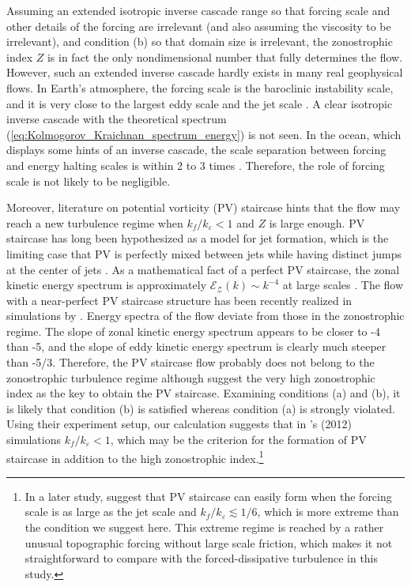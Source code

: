\documentclass{ametsoc}
\begin{document}
Assuming an extended isotropic inverse cascade range so that forcing
scale and other details of the forcing are irrelevant (and also assuming
the viscosity to be irrelevant), and condition (b) so that domain
size is irrelevant, the zonostrophic index $Z$ is in fact the only
nondimensional number that fully determines the flow. However, such
an extended inverse cascade hardly exists in many real geophysical
flows. In Earth's atmosphere, the forcing scale is the baroclinic
instability scale, and it is very close to the largest eddy scale
and the jet scale \citep{Schneider2006,Merlis2009}. A clear isotropic
inverse cascade with the theoretical spectrum (\ref{eq:Kolmogorov_Kraichnan_spectrum_energy})
is not seen. In the ocean, which displays some hints of an inverse
cascade, the scale separation between forcing and energy halting scales
is within 2 to 3 times \citep{Tulloch2011}. Therefore, the role of
forcing scale is not likely to be negligible.

Moreover, literature on potential vorticity (PV) staircase hints that
the flow may reach a new turbulence regime when $k_{f}/k_{\varepsilon}<1$
and $Z$ is large enough. PV staircase has long been hypothesized
as a model for jet formation, which is the limiting case that PV is
perfectly mixed between jets while having distinct jumps at the center
of jets \citep{Marcus1993,Marcus1998,Dunkerton2008,Dritschel2008}.
As a mathematical fact of a perfect PV staircase, the zonal kinetic
energy spectrum is approximately $\mathcal{E_{Z}}(k)\sim k^{-4}$
at large scales \citep{Saffman1971,Danilov2004a}. The flow with a
near-perfect PV staircase structure has been recently realized in
simulations by \citet{Scott2012}. Energy spectra of the flow deviate
from those in the zonostrophic regime. The slope of zonal kinetic
energy spectrum appears to be closer to -4 than -5, and the slope
of eddy kinetic energy spectrum is clearly much steeper than -5/3.
Therefore, the PV staircase flow probably does not belong to the zonostrophic
turbulence regime although \citet{Scott2012} suggest the very high
zonostrophic index as the key to obtain the PV staircase. Examining
conditions (a) and (b), it is likely that condition (b) is satisfied
whereas condition (a) is strongly violated. Using their experiment
setup, our calculation suggests that in \citeauthor{Scott2012}'s
(2012) simulations $k_{f}/k_{\varepsilon}<1$, which may be the criterion
for the formation of PV staircase in addition to the high zonostrophic
index.\footnote{In a later study, \citet{Scott2012a} suggest that PV staircase can
easily form when the forcing scale is as large as the jet scale and
$k_{f}/k_{\varepsilon}\apprle1/6$, which is more extreme than the
condition we suggest here. This extreme regime is reached by a rather
unusual topographic forcing without large scale friction, which makes
it not straightforward to compare with the forced-dissipative turbulence
in this study.} 
\end{document}
